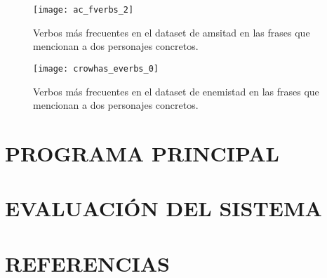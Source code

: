 \documentclass{pre-tfg}
\begin{document}
\begin{figure}
	\centering
	\texttt{[image: ac\_fverbs\_2]}
	\caption{Verbos más frecuentes en el dataset de amsitad en las frases que mencionan a dos personajes concretos.}
	\label{fig:f_verb_freq_in_character_mentions}
\end{figure}


\begin{figure}
	\centering
	\texttt{[image: crowhas\_everbs\_0]}
	\caption{Verbos más frecuentes en el dataset de enemistad en las frases que mencionan a dos personajes concretos.}
	\label{fig:e_verb_freq_in_character_mentions}
\end{figure}


\section{PROGRAMA PRINCIPAL}


\section{EVALUACIÓN DEL SISTEMA}


\section{REFERENCIAS}





\singlespacing
%

\end{document}

